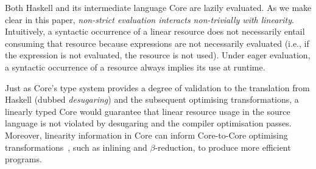 \documentclass[acmsmall,review,anonymous,screen]{acmart}
\begin{document}
Both Haskell and its intermediate language Core are lazily
        evaluated.
        As we make clear in this paper, \emph{non-strict evaluation interacts non-trivially with linearity}.
        Intuitively, a syntactic occurrence of a linear resource does not
        necessarily entail consuming that resource because expressions are not
        necessarily evaluated (i.e., if the expression is not evaluated, the
        resource is not used).
        Under eager evaluation, a syntactic occurrence of a resource always implies its use at runtime.


Just as Core's type system provides a degree of validation to the
translation from Haskell (dubbed \emph{desugaring}) and the subsequent
optimising transformations, a linearly typed Core would guarantee that
linear resource usage in the source language is not violated by desugaring
and the compiler optimisation passes. Moreover, linearity information in
Core can inform Core-to-Core optimising 
transformations~\cite{cite:let-floating,peytonjones1997a,cite:linearhaskell},
such as inlining and $\beta$-reduction, to produce more efficient programs.
%
%
\end{document}
